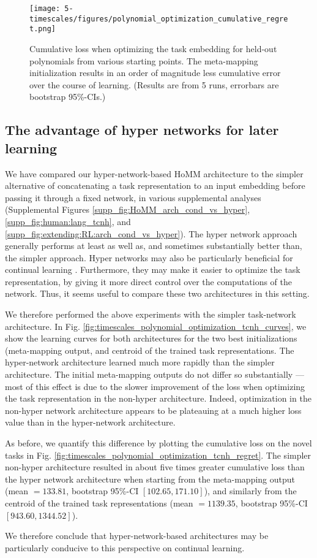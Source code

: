 \begin{figure}[p]
\centering
\texttt{[image: 5-timescales/figures/polynomial\_optimization\_cumulative\_regret.png]}
\caption[Cumulative loss when optimizing the task embedding for held-out polynomials from various starting points.]{Cumulative loss when optimizing the task embedding for held-out polynomials from various starting points. The meta-mapping initialization results in an order of magnitude less cumulative error over the course of learning. (Results are from 5 runs, errorbars are bootstrap 95\%-CIs.)} \label{fig:timescales_polynomial_optimization_regret}
\end{figure}

\subsection{The advantage of hyper networks for later learning}

We have compared our hyper-network-based HoMM architecture to the simpler alternative of concatenating a task representation to an input embedding before passing it through a fixed network, in various supplemental analyses (Supplemental Figures \ref{supp_fig:HoMM_arch_cond_vs_hyper}, \ref{supp_fig:human:lang_tcnh}, and \ref{supp_fig:extending:RL:arch_cond_vs_hyper}). The hyper network approach generally performs at least as well as, and sometimes substantially better than, the simpler approach. Hyper networks may also be particularly beneficial for continual learning \citep{Oswald2020}. Furthermore, they may make it easier to optimize the task representation, by giving it more direct control over the computations of the network. Thus, it seems useful to compare these two architectures in this setting. \par
We therefore performed the above experiments with the simpler task-network architecture. 
In Fig. \ref{fig:timescales_polynomial_optimization_tcnh_curves}, we show the learning curves for both architectures for the two best initializations (meta-mapping output, and centroid of the trained task representations. The hyper-network architecture learned much more rapidly than the simpler architecture. The initial meta-mapping outputs do not differ so substantially --- most of this effect is due to the slower improvement of the loss when optimizing the task representation in the non-hyper architecture. Indeed, optimization in the non-hyper network architecture appears to be plateauing at a much higher loss value than in the hyper-network architecture. \par
As before, we quantify this difference by plotting the cumulative loss on the novel tasks in Fig. \ref{fig:timescales_polynomial_optimization_tcnh_regret}. The simpler non-hyper architecture resulted in about five times greater cumulative loss than the hyper network architecture when starting from the meta-mapping output (mean \(= 133.81\), bootstrap 95\%-CI \([102.65, 171.10]\)), and similarly from the centroid of the trained task representations (mean \(= 1139.35\), bootstrap 95\%-CI \([943.60, 1344.52]\)). \par
We therefore conclude that hyper-network-based architectures may be particularly conducive to this perspective on continual learning.

